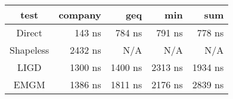 \begin{tabular}{c|r|r|r|r}
\bf{test}  & \bf{company}    & \bf{geq}        & \bf{min}        & \bf{sum}       \\
\hline
Direct     &          143 ns &          784 ns &          791 ns &          778 ns\\
Shapeless  &         2432 ns &             N/A &             N/A &             N/A\\
LIGD       &         1300 ns &         1400 ns &         2313 ns &         1934 ns\\
EMGM       &         1386 ns &         1811 ns &         2176 ns &         2839 ns\\
\end{tabular}
